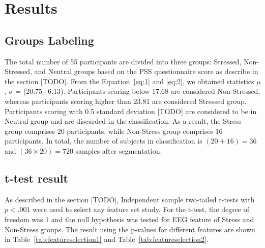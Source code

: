 \documentclass[pdflatex,sn-mathphys]{sn-jnl}%
\theoremstyle{thmstyleone}%
\theoremstyle{thmstyletwo}%
\theoremstyle{thmstylethree}%
\begin{document}
\section{Results}\label{sec4}

\subsection{Groups Labeling} \label{subsec6}
The total number of 55 participants are divided into three groups: Stressed, Non-Stressed, and Neutral groups based on the PSS questionnaire score as describe in the section [TODO]. From the Equation~\ref{eq:1} and \ref{eq:2}, we obtained statistics $\mu$, $\sigma$ = (20.75$\pm$6.13). Participants scoring below 17.68 are considered Non-Stressed, whereas participants scoring higher than 23.81 are considered Stressed group. Participants scoring with 0.5 standard deviation [TODO] are considered to be in Neutral group and are discarded in the classification. As a result, the Stress group comprises 20 participants, while Non-Stress group comprises 16 participants. In total, the number of subjects in classification is $(20 + 16) = 36$ and $(36 \times 20) = 720$ samples after segmentation.

\subsection{t-test result}
As described in the section [TODO], Independent sample two-tailed t-tests with $p < .001$ were used to select any feature set study. For the t-test, the degree of freedom was 1 and the null hypothesis was tested for EEG feature of Stress and Non-Stress groups. The result using the p-values for different features are shown in Table~\ref{tab:featureselection1} and Table~\ref{tab:featureselection2}. 

\end{document}
